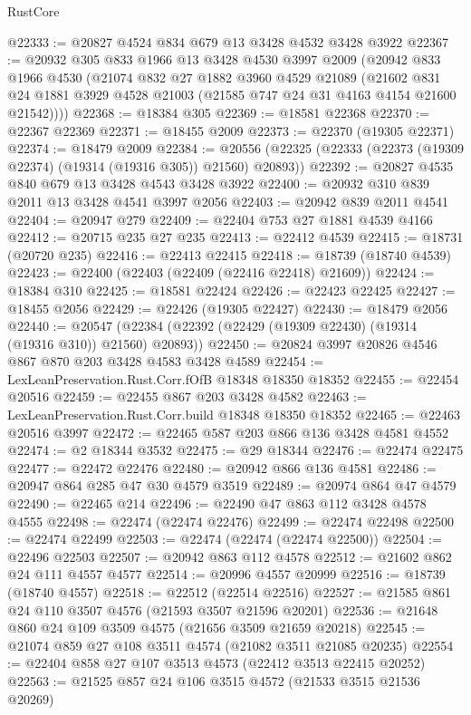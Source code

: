 \begin{lexlean}{RustCore}
\begin{coremodule}
@22333 := @20827 @4524 @834 @679 @13 @3428 @4532 @3428 @3922
@22367 := @20932
    @305
    @833
    @1966
    @13
    @3428
    @4530
    @3997
    @2009
    (@20942
      @833
      @1966
      @4530
      (@21074
        @832
        @27
        @1882
        @3960
        @4529
        @21089
        (@21602 @831 @24 @1881 @3929 @4528 @21003 (@21585 @747 @24 @31 @4163 @4154 @21600 @21542))))
@22368 := @18384 @305
@22369 := @18581 @22368
@22370 := @22367 @22369
@22371 := @18455 @2009
@22373 := @22370 (@19305 @22371)
@22374 := @18479 @2009
@22384 := @20556 (@22325 (@22333 (@22373 (@19309 @22374) (@19314 (@19316 @305)) @21560) @20893))
@22392 := @20827 @4535 @840 @679 @13 @3428 @4543 @3428 @3922
@22400 := @20932 @310 @839 @2011 @13 @3428 @4541 @3997 @2056
@22403 := @20942 @839 @2011 @4541
@22404 := @20947 @279
@22409 := @22404 @753 @27 @1881 @4539 @4166
@22412 := @20715 @235 @27 @235
@22413 := @22412 @4539
@22415 := @18731 (@20720 @235)
@22416 := @22413 @22415
@22418 := @18739 (@18740 @4539)
@22423 := @22400 (@22403 (@22409 (@22416 @22418) @21609))
@22424 := @18384 @310
@22425 := @18581 @22424
@22426 := @22423 @22425
@22427 := @18455 @2056
@22429 := @22426 (@19305 @22427)
@22430 := @18479 @2056
@22440 := @20547 (@22384 (@22392 (@22429 (@19309 @22430) (@19314 (@19316 @310)) @21560) @20893))
@22450 := @20824 @3997 @20826 @4546 @867 @870 @203 @3428 @4583 @3428 @4589
@22454 := LexLeanPreservation.Rust.Corr.fOfB @18348 @18350 @18352
@22455 := @22454 @20516
@22459 := @22455 @867 @203 @3428 @4582
@22463 := LexLeanPreservation.Rust.Corr.build @18348 @18350 @18352
@22465 := @22463 @20516 @3997
@22472 := @22465 @587 @203 @866 @136 @3428 @4581 @4552
@22474 := @2 @18344 @3532
@22475 := @29 @18344
@22476 := @22474 @22475
@22477 := @22472 @22476
@22480 := @20942 @866 @136 @4581
@22486 := @20947 @864 @285 @47 @30 @4579 @3519
@22489 := @20974 @864 @47 @4579
@22490 := @22465 @214
@22496 := @22490 @47 @863 @112 @3428 @4578 @4555
@22498 := @22474 (@22474 @22476)
@22499 := @22474 @22498
@22500 := @22474 @22499
@22503 := @22474 (@22474 (@22474 @22500))
@22504 := @22496 @22503
@22507 := @20942 @863 @112 @4578
@22512 := @21602 @862 @24 @111 @4557 @4577
@22514 := @20996 @4557 @20999
@22516 := @18739 (@18740 @4557)
@22518 := @22512 (@22514 @22516)
@22527 := @21585 @861 @24 @110 @3507 @4576 (@21593 @3507 @21596 @20201)
@22536 := @21648 @860 @24 @109 @3509 @4575 (@21656 @3509 @21659 @20218)
@22545 := @21074 @859 @27 @108 @3511 @4574 (@21082 @3511 @21085 @20235)
@22554 := @22404 @858 @27 @107 @3513 @4573 (@22412 @3513 @22415 @20252)
@22563 := @21525 @857 @24 @106 @3515 @4572 (@21533 @3515 @21536 @20269)

\end{coremodule}
\end{lexlean}
